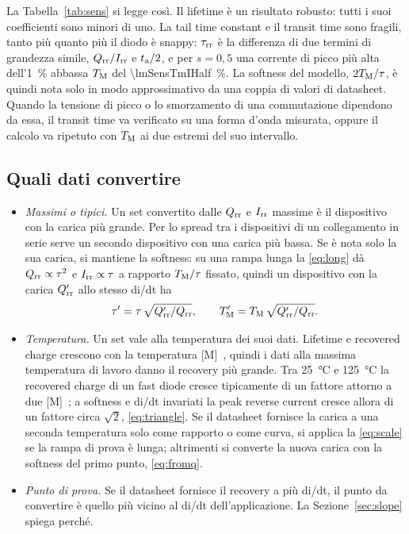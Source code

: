 \documentclass[10pt,a4paper]{scrartcl}
\let\newcommand\pdvaluedefine
\newcommand{\Irr}{I_\mathrm{rr}}
\newcommand{\Qrr}{Q_\mathrm{rr}}
\newcommand{\ta}{t_\mathrm{a}}
\newcommand{\taurr}{\tau_\mathrm{rr}}
\newcommand{\TM}{T_\mathrm{M}}
\begin{document}
La Tabella~\ref{tab:sens} si legge così. Il lifetime è un risultato robusto: tutti i suoi coefficienti sono minori di uno. La tail time constant e il transit time sono fragili, tanto più quanto più il diodo è snappy: $\taurr$ è la differenza di due termini di grandezza simile, $\Qrr/\Irr$ e $\ta/2$, e per $s = 0,5$ una corrente di picco più alta dell'\SI{1}{\percent} abbassa $\TM$ del \SI{\lmSensTmIHalf}{\percent}. La softness del modello, $2\TM/\tau$, è quindi nota solo in modo approssimativo da una coppia di valori di datasheet. Quando la tensione di picco o lo smorzamento di una commutazione dipendono da essa, il transit time va verificato su una forma d'onda misurata, oppure il calcolo va ripetuto con $\TM$ ai due estremi del suo intervallo.

\subsection{Quali dati convertire}
\label{sec:which}
\begin{itemize}
\item \emph{Massimi o tipici.} Un set convertito dalle $\Qrr$ e $\Irr$ massime è il dispositivo con la carica più grande. Per lo spread tra i dispositivi di un collegamento in serie serve un secondo dispositivo con una carica più bassa. Se è nota solo la sua carica, si mantiene la softness: su una rampa lunga la \eqref{eq:long} dà $\Qrr \propto \tau^2$ e $\Irr \propto \tau$ a rapporto $\TM/\tau$ fissato, quindi un dispositivo con la carica $\Qrr'$ allo stesso di/dt ha
\begin{equation}
\tau' = \tau\,\sqrt{\Qrr'/\Qrr} , \qquad \TM' = \TM\,\sqrt{\Qrr'/\Qrr} .
\label{eq:scale}
\end{equation}
\item \emph{Temperatura.} Un set vale alla temperatura dei suoi dati. Lifetime e recovered charge crescono con la temperatura [M]~\cite{lutz}, quindi i dati alla massima temperatura di lavoro danno il recovery più grande. Tra \SI{25}{\celsius} e \SI{125}{\celsius} la recovered charge di un fast diode cresce tipicamente di un fattore attorno a due [M]~\cite{lutz}; a softness e di/dt invariati la peak reverse current cresce allora di un fattore circa $\sqrt{2}$, \eqref{eq:triangle}. Se il datasheet fornisce la carica a una seconda temperatura solo come rapporto o come curva, si applica la \eqref{eq:scale} se la rampa di prova è lunga; altrimenti si converte la nuova carica con la softness del primo punto, \eqref{eq:fromq}.
\item \emph{Punto di prova.} Se il datasheet fornisce il recovery a più di/dt, il punto da convertire è quello più vicino al di/dt dell'applicazione. La Sezione~\ref{sec:slope} spiega perché.
\end{itemize}
\end{document}
